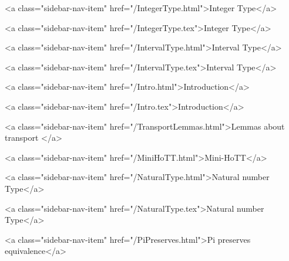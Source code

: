      
    
      
        
          <a class="sidebar-nav-item" href="/IntegerType.html">Integer Type</a>
        
      
    
      
        
          <a class="sidebar-nav-item" href="/IntegerType.tex">Integer Type</a>
        
      
    
      
        
          <a class="sidebar-nav-item" href="/IntervalType.html">Interval Type</a>
        
      
    
      
        
          <a class="sidebar-nav-item" href="/IntervalType.tex">Interval Type</a>
        
      
    
      
        
          <a class="sidebar-nav-item" href="/Intro.html">Introduction</a>
        
      
    
      
        
          <a class="sidebar-nav-item" href="/Intro.tex">Introduction</a>
        
      
    
      
        
          <a class="sidebar-nav-item" href="/TransportLemmas.html">Lemmas about transport </a>
        
      
    
      
        
          <a class="sidebar-nav-item" href="/MiniHoTT.html">Mini-HoTT</a>
        
      
    
      
        
          <a class="sidebar-nav-item" href="/NaturalType.html">Natural number Type</a>
        
      
    
      
        
          <a class="sidebar-nav-item" href="/NaturalType.tex">Natural number Type</a>
        
      
    
      
        
          <a class="sidebar-nav-item" href="/PiPreserves.html">Pi preserves equivalence</a>
        
